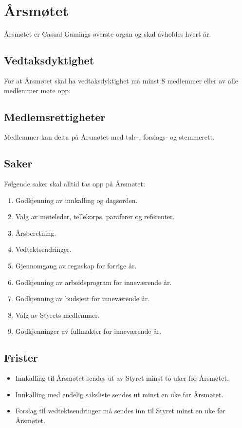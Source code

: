 \chapter{Årsmøtet}
Årsmøtet er Casual Gamings øverste organ og skal avholdes hvert år.

\section{Vedtaksdyktighet}
For at Årsmøtet skal ha vedtaksdyktighet må minst 8 medlemmer eller  av alle medlemmer møte opp.

\section{Medlemsrettigheter}
Medlemmer kan delta på Årsmøtet med tale-, forslags‐ og stemmerett.

\section{Saker}
Følgende saker skal alltid tas opp på Årsmøtet:
\begin{enumerate}
    \item Godkjenning av innkalling og dagsorden.
    \item Valg av møteleder, tellekorps, paraferer og referenter.
    \item Årsberetning.
    \item Vedtektsendringer.
    \item Gjennomgang av regnskap for forrige år.
    \item Godkjenning av arbeidsprogram for inneværende år.
    \item Godkjenning av budsjett for inneværende år.
    \item Valg av Styrets medlemmer.
    \item Godkjenninger av fullmakter for inneværende år.
\end{enumerate}

\section{Frister}
\begin{itemize}
    \item Innkalling til Årsmøtet sendes ut av Styret minst to uker før Årsmøtet.
    \item Innkalling med endelig saksliste sendes ut minst en uke før Årsmøtet.
    \item Forslag til vedtektsendringer må sendes inn til Styret minst en uke før Årsmøtet.
\end{itemize}

